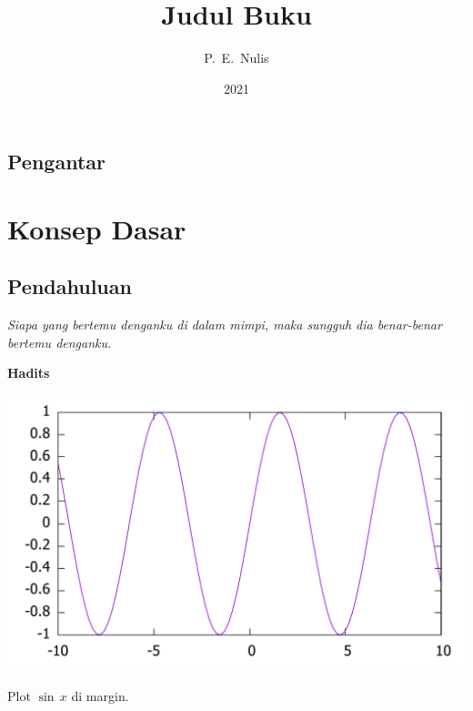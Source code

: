 \documentclass[12pt,justified,a4paper,twoside,symmetric,titlepage]{tufte-book}
\title{Judul Buku}
\author{P.~E.~Nulis}
\date{2021}
\begin{document}
\maketitle
\thispagestyle{empty}
\tableofcontents
\pagestyle{fancy}
\listoffigures
{}
\listoftables
{}

\chapter*{Pengantar}
\lipsum

\part{Konsep Dasar}

\chapter{Pendahuluan}

\epigraph{\itshape Siapa yang bertemu denganku di dalam mimpi, maka sungguh dia benar-benar bertemu denganku.}{\bfseries Hadits}

\begin{marginfigure}
\label{gbrMargin}
\begin{center}
\includegraphics[width=\textwidth]{plotsinus.pdf}
\end{center}
\caption{Plot $\sin\,x$ di margin.}
\end{marginfigure}

\lipsum[1-3]
\end{document}
